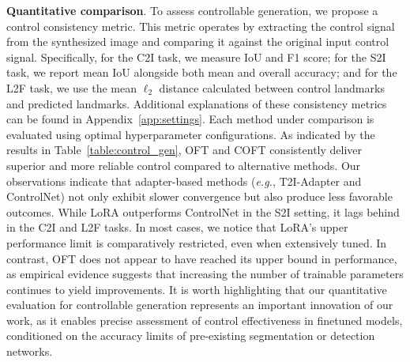 \textbf{Quantitative comparison}. To assess controllable generation, we propose a control consistency metric. This metric operates by extracting the control signal from the synthesized image and comparing it against the original input control signal. Specifically, for the C2I task, we measure IoU and F1 score; for the S2I task, we report mean IoU alongside both mean and overall accuracy; and for the L2F task, we use the mean $\ell_2$ distance calculated between control landmarks and predicted landmarks. Additional explanations of these consistency metrics can be found in Appendix~\ref{app:settings}. Each method under comparison is evaluated using optimal hyperparameter configurations. As indicated by the results in Table~\ref{table:control_gen}, OFT and COFT consistently deliver superior and more reliable control compared to alternative methods. Our observations indicate that adapter-based methods (\emph{e.g.}, T2I-Adapter and ControlNet) not only exhibit slower convergence but also produce less favorable outcomes. While LoRA outperforms ControlNet in the S2I setting, it lags behind in the C2I and L2F tasks. In most cases, we notice that LoRA's upper performance limit is comparatively restricted, even when extensively tuned. In contrast, OFT does not appear to have reached its upper bound in performance, as empirical evidence suggests that increasing the number of trainable parameters continues to yield improvements. It is worth highlighting that our quantitative evaluation for controllable generation represents an important innovation of our work, as it enables precise assessment of control effectiveness in finetuned models, conditioned on the accuracy limits of pre-existing segmentation or detection networks.

